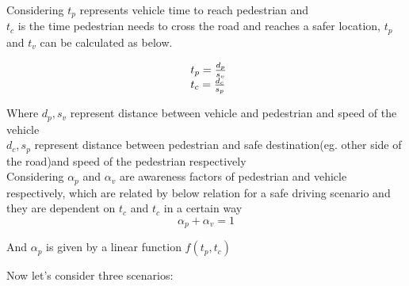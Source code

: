 Considering ${t_p}$ represents vehicle time to reach pedestrian and \\
${t_c}$ is the time pedestrian needs to cross the road and reaches a safer location,
${t_p}$ and ${t_v}$  can be calculated as below.

\begin{equation}
\begin{array}{l@{}}
  t_p = \frac{d_p}{s_v} \\
	t_c = \frac{d_c}{s_p}
\end{array}
\end{equation}

Where ${d_p},{s_v}$ represent distance between vehicle and pedestrian and speed of the vehicle\\
${d_c}, {s_p}$ represent distance between pedestrian and safe destination(eg. other side of the road)and speed of the pedestrian respectively \\

Considering $\alpha_p$ and $\alpha_v$ are awareness factors of pedestrian and vehicle respectively, which are related by below relation for a safe driving scenario and they are dependent on ${t_c}$ and ${t_c}$ in a certain way \\
\begin{equation}
  \alpha_p + \alpha_v = 1
\end{equation}

And $\alpha_p$ is given by a linear function $f(t_p, t_c)$ 

Now let's consider three scenarios:

